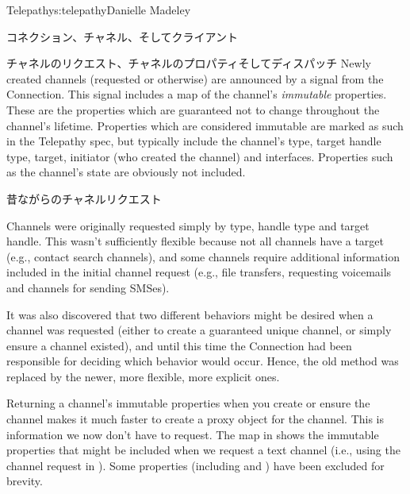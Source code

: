 \begin{aosachapter}{Telepathy}{s:telepathy}{Danielle Madeley}
\begin{aosasect1}{コネクション、チャネル、そしてクライアント}
\begin{aosasect2}{チャネルのリクエスト、チャネルのプロパティそしてディスパッチ}
Newly created channels (requested or otherwise) are announced by a
signal from the Connection. This signal includes a map of the
channel's \emph{immutable} properties. These are the properties which
are guaranteed not to change throughout the channel's lifetime.
Properties which are considered immutable are marked as such in the
Telepathy spec, but typically include the channel's type, target
handle type, target, initiator (who created the channel) and
interfaces.  Properties such as the channel's state are obviously not
included.

\begin{aosabox}{昔ながらのチャネルリクエスト}

Channels were originally requested simply by type, handle type and
target handle.  This wasn't sufficiently flexible because not all
channels have a target (e.g., contact search channels), and some
channels require additional information included in the initial
channel request (e.g., file transfers, requesting voicemails and
channels for sending SMSes).

It was also discovered that two different behaviors might be desired
when a channel was requested (either to create a guaranteed unique
channel, or simply ensure a channel existed), and until this time the
Connection had been responsible for deciding which behavior would
occur.  Hence, the old method was replaced by the newer, more
flexible, more explicit ones.

\end{aosabox}

\pagebreak

Returning a channel's immutable properties when you create or ensure
the channel makes it much faster to create a proxy object for the
channel. This is information we now don't have to request.  The map in
 shows the immutable properties
that might be included when we request a text channel (i.e., using the
channel request in ). Some
properties (including  and )
have been excluded for brevity.


\end{aosasect2}
\end{aosasect1}
\end{aosachapter}
